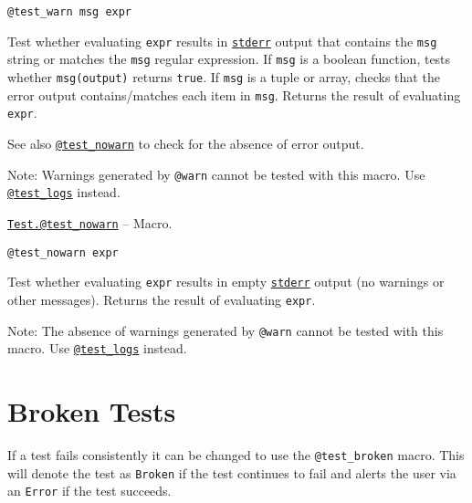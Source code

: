 \begin{adjustwidth}{2em}{0pt}


\begin{verbatim}
@test_warn msg expr
\end{verbatim}

Test whether evaluating \texttt{expr} results in \hyperlink{6150355911915549172}{\texttt{stderr}} output that contains the \texttt{msg} string or matches the \texttt{msg} regular expression.  If \texttt{msg} is a boolean function, tests whether \texttt{msg(output)} returns \texttt{true}.  If \texttt{msg} is a tuple or array, checks that the error output contains/matches each item in \texttt{msg}. Returns the result of evaluating \texttt{expr}.

See also \hyperlink{14168562674427079535}{\texttt{@test\_nowarn}} to check for the absence of error output.

Note: Warnings generated by \texttt{@warn} cannot be tested with this macro. Use \hyperlink{1395021091279173086}{\texttt{@test\_logs}} instead.



\end{adjustwidth}
\hypertarget{14168562674427079535}{}
\hyperlink{14168562674427079535}{\texttt{Test.@test\_nowarn}}  -- {Macro.}

\begin{adjustwidth}{2em}{0pt}


\begin{verbatim}
@test_nowarn expr
\end{verbatim}

Test whether evaluating \texttt{expr} results in empty \hyperlink{6150355911915549172}{\texttt{stderr}} output (no warnings or other messages).  Returns the result of evaluating \texttt{expr}.

Note: The absence of warnings generated by \texttt{@warn} cannot be tested with this macro. Use \hyperlink{1395021091279173086}{\texttt{@test\_logs}} instead.



\end{adjustwidth}

\hypertarget{5668454159546922035}{}


\section{Broken Tests}



If a test fails consistently it can be changed to use the \texttt{@test\_broken} macro. This will denote the test as \texttt{Broken} if the test continues to fail and alerts the user via an \texttt{Error} if the test succeeds.


